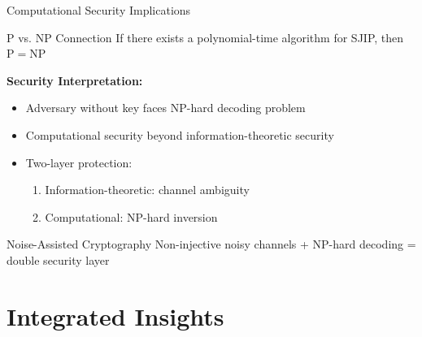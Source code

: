\documentclass[aspectratio=169,12pt]{beamer}
\begin{document}
\begin{frame}{Computational Security Implications}
\begin{block}{P vs. NP Connection}
If there exists a polynomial-time algorithm for SJIP, then $\mathrm{P} = \mathrm{NP}$
\end{block}

\vspace{0.3cm}

\textbf{Security Interpretation:}
\begin{itemize}
\item Adversary without key faces NP-hard decoding problem
\item Computational security beyond information-theoretic security
\item Two-layer protection:
\begin{enumerate}
\item Information-theoretic: channel ambiguity
\item Computational: NP-hard inversion
\end{enumerate}
\end{itemize}

\vspace{0.3cm}

\begin{alertblock}{Noise-Assisted Cryptography}
Non-injective noisy channels + NP-hard decoding = double security layer
\end{alertblock}
\end{frame}

\section{Integrated Insights}
\end{document}
